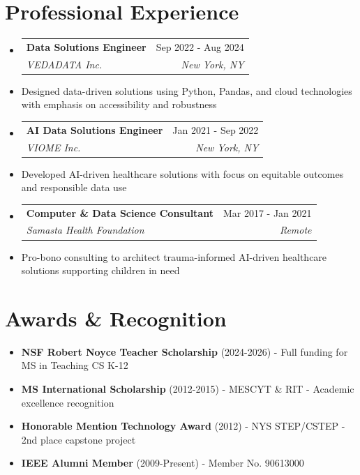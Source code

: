 \documentclass[10pt]{article}
\makeatletter
\newcommand{\resumeItem}[1]{\item\small{#1}}
\newcommand{\resumeSubheading}[4]{
  \vspace{-1pt}\item
    \begin{tabular*}{0.97\textwidth}[t]{l@{\extracolsep{\fill}}r}
      \textbf{#1} & #2 \\
      \textit{\small#3} & \textit{\small #4} \\
    \end{tabular*}\vspace{-5pt}
}
\makeatother
\begin{document}

\section{Professional Experience}

\begin{itemize}[leftmargin=*]
\resumeSubheading
{Data Solutions Engineer}{Sep 2022 - Aug 2024}
{VEDADATA Inc.}{New York, NY}
\resumeItem{Designed data-driven solutions using Python, Pandas, and cloud technologies with emphasis on accessibility and robustness}

\resumeSubheading
{AI Data Solutions Engineer}{Jan 2021 - Sep 2022}
{VIOME Inc.}{New York, NY}
\resumeItem{Developed AI-driven healthcare solutions with focus on equitable outcomes and responsible data use}

\resumeSubheading
{Computer \& Data Science Consultant}{Mar 2017 - Jan 2021}
{Samasta Health Foundation}{Remote}
\resumeItem{Pro-bono consulting to architect trauma-informed AI-driven healthcare solutions supporting children in need}
\end{itemize}


\section{Awards \& Recognition}

\begin{itemize}[leftmargin=*]
\item \textbf{NSF Robert Noyce Teacher Scholarship} (2024-2026) - Full funding for MS in Teaching CS K-12
\item \textbf{MS International Scholarship} (2012-2015) - MESCYT \& RIT - Academic excellence recognition
\item \textbf{Honorable Mention Technology Award} (2012) - NYS STEP/CSTEP - 2nd place capstone project
\item \textbf{IEEE Alumni Member} (2009-Present) - Member No. 90613000
\end{itemize}
\end{document}
